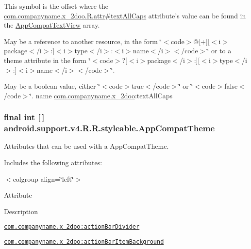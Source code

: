 This symbol is the offset where the \hyperlink{classcom_1_1companyname_1_1x__2doo_1_1_r_1_1attr_440c890fd0d9d20178637dc0b7939341}{com.companyname.x\_\-2doo.R.attr\#textAllCaps} attribute's value can be found in the \hyperlink{classandroid_1_1support_1_1v4_1_1_r_1_1styleable_2000bab6df68054d5e2a8e1f43e47fc8}{AppCompatTextView} array.

May be a reference to another resource, in the form \char`\"{}$<$code$>$@\mbox{[}+\mbox{]}\mbox{[}$<$i$>$package$<$/i$>$:\mbox{]}$<$i$>$type$<$/i$>$:$<$i$>$name$<$/i$>$$<$/code$>$\char`\"{} or to a theme attribute in the form \char`\"{}$<$code$>$?\mbox{[}$<$i$>$package$<$/i$>$:\mbox{]}\mbox{[}$<$i$>$type$<$/i$>$:\mbox{]}$<$i$>$name$<$/i$>$$<$/code$>$\char`\"{}. 

May be a boolean value, either \char`\"{}$<$code$>$true$<$/code$>$\char`\"{} or \char`\"{}$<$code$>$false$<$/code$>$\char`\"{}.  name \hyperlink{namespacecom_1_1companyname_1_1x__2doo}{com.companyname.x\_\-2doo}:textAllCaps \hypertarget{classandroid_1_1support_1_1v4_1_1_r_1_1styleable_0873e92ba21076bb5a4aeadeb7f5779f}{
\subsubsection[{AppCompatTheme}]{\setlength{\rightskip}{0pt plus 5cm}final int \mbox{[}$\,$\mbox{]} android.support.v4.R.R.styleable.AppCompatTheme}}
\label{classandroid_1_1support_1_1v4_1_1_r_1_1styleable_0873e92ba21076bb5a4aeadeb7f5779f}


Attributes that can be used with a AppCompatTheme. 

Includes the following attributes: \begin{TabularC}{0}
\hline
\end{TabularC}
$<$colgroup align=\char`\"{}left\char`\"{}$>$ 

Attribute

Description 

{\tt \hyperlink{classandroid_1_1support_1_1v4_1_1_r_1_1styleable_a5d8289303e56212e5d12315d20673e4}{com.companyname.x\_\-2doo:actionBarDivider}}

{\tt \hyperlink{classandroid_1_1support_1_1v4_1_1_r_1_1styleable_2f97502dea4ecbf53eeb7b290f197fed}{com.companyname.x\_\-2doo:actionBarItemBackground}}

